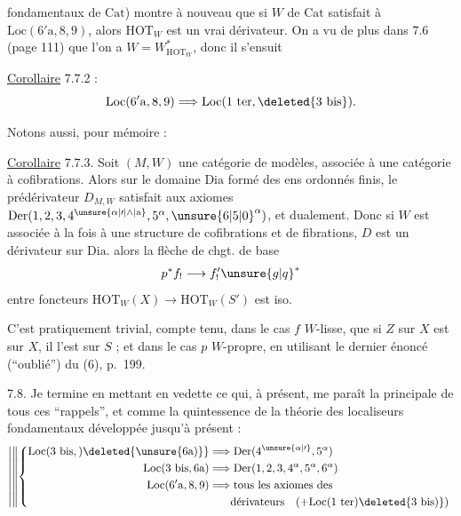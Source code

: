 fondamentaux de $\mathrm{Cat}$) montre à
nouveau que si $W$  de $\mathrm{Cat}$ satisfait
à $\mathrm{Loc}(6'\mathrm{a},8,9)$, alors $\mathrm{HOT}_{W}$ est
un vrai dérivateur. On a vu de
plus dans 7.6 (page 111) que l'on
a  $W=W^{\ast}_{\mathrm{HOT}_{W}}$, donc il s'ensuit

\uline{Corollaire} 7.7.2 :  
\[
\mathrm{Loc}(6'\mathrm{a},8,9)\Longrightarrow\mathrm{Loc}(1\ \mathrm{ter},\deleted{3\ \mathrm{bis}}).
\]

Notons aussi, pour mémoire :

\uline{Corollaire} 7.7.3. Soit $(M,W)$ une
catégorie de modèles, associée à
une catégorie à cofibrations. Alors
sur le domaine $\mathrm{Dia}$ formé des
ens ordonnés finis, le prédérivateur
$D_{M,W}$ satisfait aux axiomes
$\mathrm{Der}(1,2,3,4^{\unsure{\alpha|\prime|\wedge|\mathrm{a}}},5^{\alpha},\unsure{6|5|0}^{\alpha})$, et dualement. Donc
si $W$ est associée à la fois à une
structure de cofibrations et de fibrations,
$D$ est un dérivateur sur $\mathrm{Dia}$.
alors la flèche de chgt. de base
\[
p^{\ast}f_{!}\longrightarrow f'_{!}\unsure{g|q}^{\ast}
\]
entre foncteurs $\mathrm{HOT}_{W}(X)\longrightarrow\mathrm{HOT}_{W}(S')$ est iso.

C'est pratiquement trivial, compte tenu, dans
le cas $f$ $W$-lisse, que si $Z$ sur $X$ est  sur $X$,
il l'est sur $S$ ; et dans le cas $p$ $W$-propre, en
utilisant le dernier énoncé (``oublié'') du (6),
p.~199.

7.8. Je termine en mettant en vedette
ce qui, à présent, me paraît la
  principale de tous ces ``rappels'', et
comme la quintessence de la théorie des localiseurs
fondamentaux développée jusqu'à présent :
\[
\left|\left\Vert\left\{\begin{aligned}
\mathrm{Loc}(3\ \mathrm{bis},)\deleted{\unsure{6\mathrm{a})}}&\Longrightarrow\mathrm{Der}(4^{\unsure{\alpha|\prime}},5^{\alpha})\\
\mathrm{Loc}(3\ \mathrm{bis},6\mathrm{a})&\Longrightarrow\mathrm{Der}(1,2,3,4^{\alpha},5^{\alpha},6^{\alpha})\\
\mathrm{Loc}(6'\mathrm{a},8,9)&\Longrightarrow\text{tous les axiomes des}\\
&\hphantom{\Longrightarrow{}}\text{dérivateurs}\quad(+\mathrm{Loc}(1\ \mathrm{ter})\deleted{3\ \mathrm{bis})})
\end{aligned}\right.\right.\right.
\]

